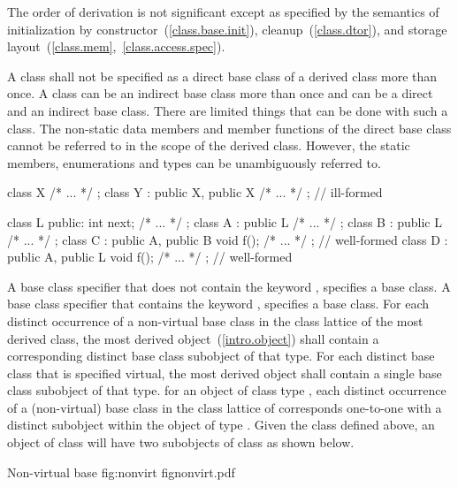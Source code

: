 \pnum
{}%
%
\enternote
The order of derivation is not significant except as specified by the
semantics of initialization by constructor~(\ref{class.base.init}),
cleanup~(\ref{class.dtor}), and storage
layout~(\ref{class.mem},~\ref{class.access.spec}).
\exitnote

\pnum
A class shall not be specified as a direct base class of a derived class
more than once.
\enternote
A class can be an indirect base class more than once and can be a direct
and an indirect base class. There are limited things that can be done
with such a class. The non-static data members and member functions of
the direct base class cannot be referred to in the scope of the derived
class. However, the static members, enumerations and types can be
unambiguously referred to.
\exitnote
\enterexample
\begin{codeblock}
class X { /* ... */ };
class Y : public X, public X { /* ... */ };             // ill-formed

\end{codeblock}
\begin{codeblock}
class L { public: int next;  /* ... */ };
class A : public L { /* ... */ };
class B : public L { /* ... */ };
class C : public A, public B { void f(); /* ... */ };   // well-formed
class D : public A, public L { void f(); /* ... */ };   // well-formed
\end{codeblock}
\exitexample

\pnum
{}%
A base class specifier that does not contain the keyword
, specifies a  base class. A base
class specifier that contains the keyword , specifies a
 base class. For each distinct occurrence of a
non-virtual base class in the class lattice of the most derived class,
the most derived object~(\ref{intro.object}) shall contain a
corresponding distinct base class subobject of that type. For each
distinct base class that is specified virtual, the most derived object
shall contain a single base class subobject of that type.
\enterexample
for an object of class type , each distinct occurrence of a
(non-virtual) base class  in the class lattice of 
corresponds one-to-one with a distinct  subobject within the
object of type . Given the class  defined above, an
object of class  will have two subobjects of class  as
shown below.

\begin{importgraphic}
{Non-virtual base}
{fig:nonvirt}
{fignonvirt.pdf}
\end{importgraphic}

